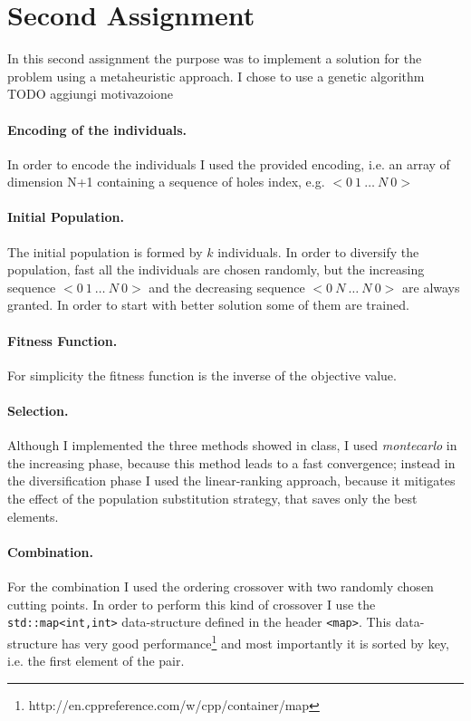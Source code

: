 \section{Second Assignment}
In this second assignment the purpose was to implement a solution for the problem
using a metaheuristic approach.
I chose to use a genetic algorithm TODO aggiungi motivazoione
\paragraph{Encoding of the individuals.} In order to encode the individuals I used the provided
encoding, i.e. an array of dimension N+1 containing a sequence of holes index, e.g.
$<0\ 1\ \dots\ N\ 0>$
\paragraph{Initial Population.} The initial population is formed by $k$ individuals.
In order to diversify the population, fast all the individuals are chosen randomly, but
the increasing sequence $<0\ 1\ \dots\ N\ 0>$ and the decreasing sequence $<0\ N\ \dots\ N\ 0>$
are always granted. In order to start with better solution some of them are trained.

\paragraph{Fitness Function.} For simplicity the fitness function is the inverse of the
objective value.

\paragraph{Selection.} Although I implemented the three methods showed in class, I used \emph{montecarlo}
in the increasing phase, because this method leads to a fast convergence; instead in the diversification phase I used the linear-ranking approach, because it
mitigates the effect of the population substitution strategy, that 
saves only the best elements.

\paragraph{Combination.} For the combination I used the ordering crossover with two randomly
chosen cutting points. In order to perform this kind of crossover I use the
\verb|std::map<int,int>| data-structure defined in the header \verb|<map>|. This data-structure
has very good performance\footnote{http://en.cppreference.com/w/cpp/container/map} and most importantly it is sorted by key, i.e. the first element of the pair. 

